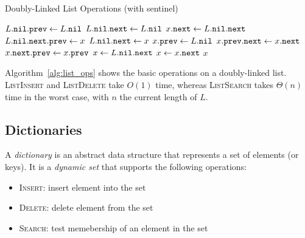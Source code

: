 \begin{algorithm}[htb]
  \caption{Doubly-Linked List Operations (with sentinel)}
  \label{alg:list_ops}
  \begin{algorithmic}[1]
      \State $L\mathtt{.}\mathtt{nil}\mathtt{.}\mathtt{prev} \gets L\mathtt{.}\mathtt{nil}$
      \State $L\mathtt{.}\mathtt{nil}\mathtt{.}\mathtt{next} \gets L\mathtt{.}\mathtt{nil}$
    \EndFunction
     
      \State $x\mathtt{.}\mathtt{next} \gets L\mathtt{.}\mathtt{nil}\mathtt{.}\mathtt{next}$
      \State $L\mathtt{.}\mathtt{nil}\mathtt{.}\mathtt{next}\mathtt{.}\mathtt{prev} \gets x$
      \State $L\mathtt{.}\mathtt{nil}\mathtt{.}\mathtt{next} \gets x$
      \State $x\mathtt{.}\mathtt{prev} \gets L\mathtt{.}\mathtt{nil}$
    \EndFunction
      \State $x\mathtt{.}\mathtt{prev}\mathtt{.}\mathtt{next} \gets x\mathtt{.}\mathtt{next}$
      \State $x\mathtt{.}\mathtt{next}\mathtt{.}\mathtt{prev} \gets x\mathtt{.}\mathtt{prev}$
    \EndFunction
      \State $x \gets L\mathtt{.}\mathtt{nil}\mathtt{.}\mathtt{next}$
        \State $x \gets x\mathtt{.}\mathtt{next}$
      \EndWhile
      \State \Return $x$
    \EndFunction
  \end{algorithmic}
\end{algorithm}



Algorithm~\ref{alg:list_ops} shows the basic operations on a doubly-linked list.
\textsc{ListInsert} and \textsc{ListDelete} take \(O(1)\) time,
whereas \textsc{ListSearch} takes \(\Theta(n)\) time in the worst case,
with \(n\) the current length of \(L\).


\subsection{Dictionaries}
\begin{definition}[Dictionary]
\label{def:dictionary}
A \emph{dictionary} is an abstract data structure that represents a set of elements (or keys). 
It is a \emph{dynamic set} that supports the following operations:
\begin{itemize}%
\item \textsc{Insert}: insert element into the set
\item \textsc{Delete}: delete element from the set
\item \textsc{Search}: test memebership of an element in the set \qedhere
\end{itemize}
\end{definition}

